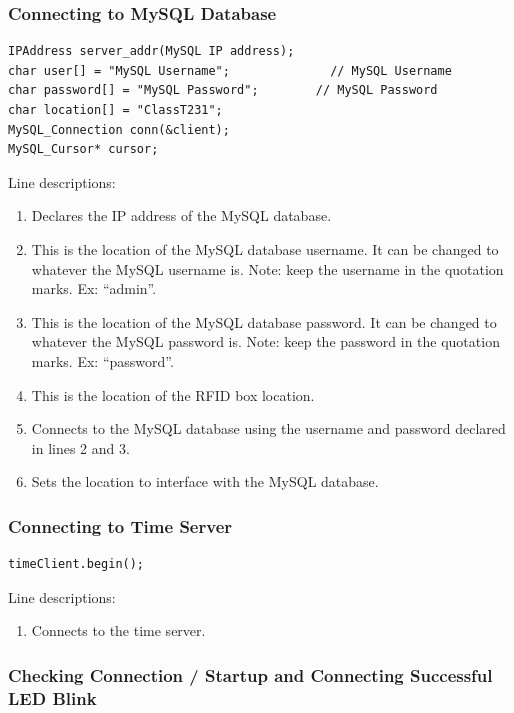 \documentclass[12pt]{article}
\begin{document}
\begin{spacing}{1.2}
\subsubsection{Connecting to MySQL Database}

\begin{lstlisting}[language=Arduino]  
IPAddress server_addr(MySQL IP address);
char user[] = "MySQL Username";              // MySQL Username
char password[] = "MySQL Password";        // MySQL Password
char location[] = "ClassT231";
MySQL_Connection conn(&client);
MySQL_Cursor* cursor;
\end{lstlisting}

Line descriptions:
\begin{enumerate}
	\item Declares the IP address of the MySQL database.
	\item This is the location of the MySQL database username. It can be changed to whatever the MySQL
username is. Note: keep the username in the quotation marks. Ex: “admin”.
	\item This is the location of the MySQL database password. It can be changed to whatever the MySQL
password is. Note: keep the password in the quotation marks. Ex: “password”.
	\item This is the location of the RFID box location.
	\item Connects to the MySQL database using the username and password declared in lines 2 and 3.
	\item Sets the location to interface with the MySQL database.
\end{enumerate}

\subsubsection{Connecting to Time Server}

\begin{lstlisting}[language=Arduino]  
timeClient.begin();
\end{lstlisting}

Line descriptions:
\begin{enumerate}
	\item Connects to the time server.
\end{enumerate}

\subsubsection{Checking Connection / Startup and Connecting Successful LED Blink}


\end{spacing}
\end{document}
